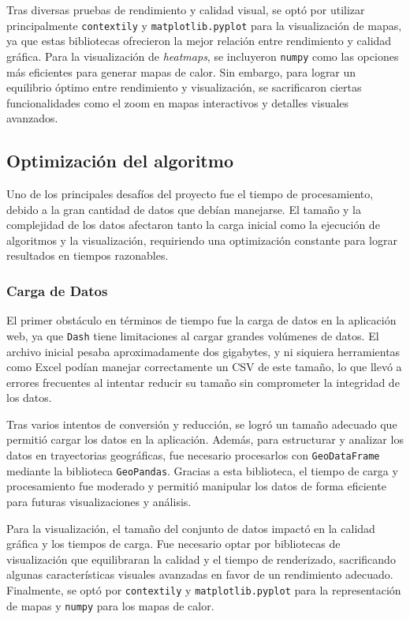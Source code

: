 Tras diversas pruebas de rendimiento y calidad visual, se optó por utilizar principalmente \texttt{contextily} y \texttt{matplotlib.pyplot} para la visualización de mapas, ya que estas bibliotecas ofrecieron la mejor relación entre rendimiento y calidad gráfica. Para la visualización de \textit{heatmaps}, se incluyeron \texttt{numpy} como las opciones más eficientes para generar mapas de calor. Sin embargo, para lograr un equilibrio óptimo entre rendimiento y visualización, se sacrificaron ciertas funcionalidades como el zoom en mapas interactivos y detalles visuales avanzados.


\subsection{Optimización del algoritmo}

Uno de los principales desafíos del proyecto fue el tiempo de procesamiento, debido a la gran cantidad de datos que debían manejarse. El tamaño y la complejidad de los datos afectaron tanto la carga inicial como la ejecución de algoritmos y la visualización, requiriendo una optimización constante para lograr resultados en tiempos razonables.

\subsubsection{Carga de Datos}

El primer obstáculo en términos de tiempo fue la carga de datos en la aplicación web, ya que \texttt{Dash} tiene limitaciones al cargar grandes volúmenes de datos. El archivo inicial pesaba aproximadamente dos gigabytes, y ni siquiera herramientas como Excel podían manejar correctamente un CSV de este tamaño, lo que llevó a errores frecuentes al intentar reducir su tamaño sin comprometer la integridad de los datos.

Tras varios intentos de conversión y reducción, se logró un tamaño adecuado que permitió cargar los datos en la aplicación. Además, para estructurar y analizar los datos en trayectorias geográficas, fue necesario procesarlos con \texttt{GeoDataFrame} mediante la biblioteca \texttt{GeoPandas}. Gracias a esta biblioteca, el tiempo de carga y procesamiento fue moderado y permitió manipular los datos de forma eficiente para futuras visualizaciones y análisis.

Para la visualización, el tamaño del conjunto de datos impactó en la calidad gráfica y los tiempos de carga. Fue necesario optar por bibliotecas de visualización que equilibraran la calidad y el tiempo de renderizado, sacrificando algunas características visuales avanzadas en favor de un rendimiento adecuado. Finalmente, se optó por \texttt{contextily} y \texttt{matplotlib.pyplot} para la representación de mapas y \texttt{numpy} para los mapas de calor.

